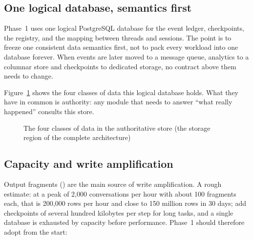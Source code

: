 \subsection{One logical database, semantics first}

Phase~1 uses one logical PostgreSQL database for the event ledger, checkpoints, the registry, and the mapping between threads and sessions. The point is to freeze one consistent data semantics first, not to pack every workload into one database forever. When events are later moved to a message queue, analytics to a columnar store and checkpoints to dedicated storage, no contract above them needs to change.

Figure~\ref{fig:zoom-storage} shows the four classes of data this logical database holds. What they have in common is authority: any module that needs to answer ``what really happened'' consults this store.

\begin{figure}[htbp]
\centering
{}
\caption[The authoritative store]{The four classes of data in the authoritative store (the storage region of the complete architecture)}
\label{fig:zoom-storage}
\end{figure}

\subsection{Capacity and write amplification}

Output fragments () are the main source of write amplification. A rough estimate: at a peak of 2,000 conversations per hour with about 100 fragments each, that is 200,000 rows per hour and close to 150 million rows in 30 days; add checkpoints of several hundred kilobytes per step for long tasks, and a single database is exhausted by capacity before performance. Phase~1 should therefore adopt from the start:

